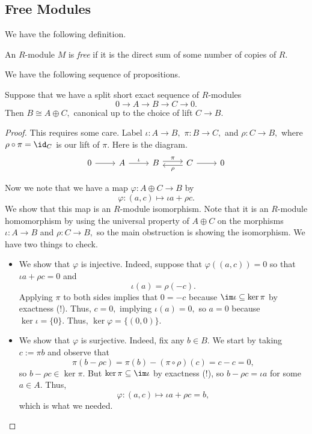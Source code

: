 \documentclass[../notes.tex]{subfiles}
\begin{document}
\subsection{Free Modules}
We have the following definition.
\begin{defi}[Free]
	An $R$-module $M$ is \textit{free} if it is the direct sum of some number of copies of $R.$
\end{defi}
We have the following sequence of propositions.
\begin{proposition}
	Suppose that we have a split short exact sequence of $R$-modules
	\[0\to A\to B\to C\to 0.\]
	Then $B\cong A\oplus C,$ canonical up to the choice of lift $C\to B.$
\end{proposition}
\begin{proof}
	This requires some care. Label $\iota:A\to B,$ $\pi:B\to C,$ and $\rho:C\to B,$ where $\rho\circ\pi=\id_C$ is our lift of $\pi.$ Here is the diagram.
	\[\begin{tikzcd}
		0 & A & B & C & 0
		\arrow[from=1-1, to=1-2]
		\arrow["\iota", from=1-2, to=1-3]
		\arrow["\pi", shift left=1, from=1-3, to=1-4]
		\arrow[from=1-4, to=1-5]
		\arrow["\rho", shift left=1, from=1-4, to=1-3]
	\end{tikzcd}\]

	Now we note that we have a map $\varphi:A\oplus C\to B$ by
	\[\varphi:(a,c)\mapsto\iota a+\rho c.\]
	We show that this map is an $R$-module isomorphism. Note that it is an $R$-module homomorphism by using the universal property of $A\oplus C$ on the morphisms $\iota:A\to B$ and $\rho:C\to B,$ so the main obstruction is showing the isomorphism. We have two things to check.
	\begin{itemize}
		\item We show that $\varphi$ is injective. Indeed, suppose that $\varphi((a,c))=0$ so that $\iota a+\rho c=0$ and
		\[\iota(a)=\rho(-c).\]
		Applying $\pi$ to both sides implies that $0=-c$ because $\im\iota\subseteq\ker\pi$ by exactness (!). Thus, $c=0,$ implying $\iota(a)=0,$ so $a=0$ because $\ker\iota=\{0\}.$ Thus, $\ker\varphi=\{(0,0)\}.$
		\item We show that $\varphi$ is surjective. Indeed, fix any $b\in B.$ We start by taking $c:=\pi b$ and observe that
		\[\pi(b-\rho c)=\pi(b)-(\pi\circ\rho)(c)=c-c=0,\]
		so $b-\rho c\in\ker\pi.$ But $\ker\pi\subseteq\im\iota$ by exactness (!), so $b-\rho c=\iota a$ for some $a\in A.$ Thus,
		\[\varphi:(a,c)\mapsto\iota a+\rho c=b,\]
		which is what we needed.
		\qedhere
	\end{itemize}
\end{proof}
\end{document}
